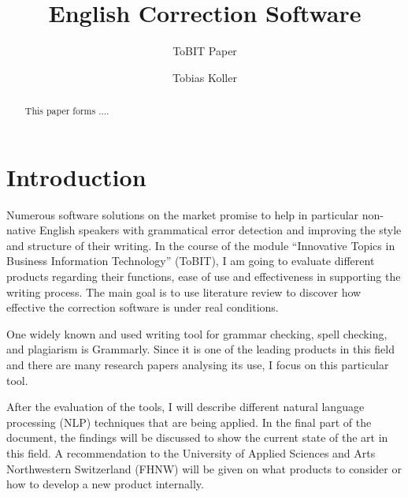 \documentclass[runningheads]{llncs}
\let\OldTextregistered\textregistered
\renewcommand{\textregistered}{\OldTextregistered\xspace}
\begin{document}
\title{English Correction Software}
\subtitle{ToBIT Paper}

\author{Tobias Koller}



\maketitle              %


\begin{abstract}
This paper forms ....

\end{abstract}



\section{Introduction}
Numerous software solutions on the market promise to help in particular non-native English speakers with grammatical error detection and improving the style and structure of their writing. In the course of the module ``Innovative Topics in Business Information Technology'' (ToBIT), I am going to evaluate different products regarding their functions, ease of use and effectiveness in supporting the writing process. The main goal is to use literature review to discover how effective the correction software is under real conditions.

One widely known and used writing tool for grammar checking, spell checking, and plagiarism is Grammarly\textregistered. Since it is one of the leading products in this field and there are many research papers analysing its use, I focus on this particular tool.

After the evaluation of the tools, I will describe different natural language processing (NLP) techniques that are being applied. In the final part of the document, the findings will be discussed to show the current state of the art in this field. A recommendation to the University of Applied Sciences and Arts Northwestern Switzerland (FHNW) will be given on what products to consider or how to develop a new product internally.
\end{document}
